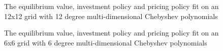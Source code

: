 \documentclass[12pt]{article}
\begin{document}
\begin{figure}[H]
  \centering
  \caption{The equilibrium value, investment policy and pricing policy fit on an 12x12 grid with 12 degree multi-dimensional Chebyshev polynomials}
  \label{gibbslittle}
\end{figure}

\begin{figure}[H]
  \centering
  \caption{The equilibrium value, investment policy and pricing policy fit on an 6x6 grid with 6 degree multi-dimensional Chebyshev polynomials}
  \label{gibbsmore}
\end{figure}
\end{document}

